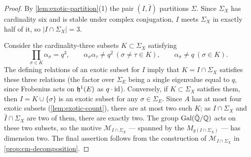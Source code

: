 \begin{proof}
  By \cref{lem:exotic-partition}(1) the pair \((I, \bar I)\) partitions
  \(\Sigma\). Since \(\Sigma_X\) has cardinality six and is stable under complex
  conjugation, \(I\) meets \(\Sigma_X\) in exactly half of it, so
  \(|I \cap \Sigma_X| = 3\).

  Consider the cardinality-three subsets \(K \subset \Sigma_X\) satisfying
  \[\prod_{\sigma \in K} \alpha_\sigma = q^3, \qquad
    \alpha_\sigma \alpha_\tau \neq q^2 \ (\sigma \neq \tau \in K), \qquad
    \alpha_\sigma \neq q \ (\sigma \in K).\]
  The defining relations of an exotic subset for \(I\) imply that
  \(K = I \cap \Sigma_X\) satisfies these three relations (the factor over
  \(\Sigma_E\) being a single eigenvalue equal to \(q\), since Frobenius acts on
  \(\mathfrak{h}^1(E)\) as \(q\cdot\mathrm{id}\)). Conversely, if \(K \subset \Sigma_X\) satisfies
  them, then \(I = K \cup \{\sigma\}\) is an exotic subset for any
  \(\sigma \in \Sigma_E\). Since \(A\) has at most four exotic subsets
  (\cref{lem:exotic-count}), there are at most two such \(K\); as
  \(I \cap \Sigma_X\) and \(\bar I \cap \Sigma_X\) are two of them, there are
  exactly two. The group \(\mathrm{Gal}(\bar{\mathbb{Q}}/\mathbb{Q})\) acts on these two subsets, so the
  motive \(\mathcal{M}_{I \cap \Sigma_X}\) — spanned by the \(M_{g(I \cap
  \Sigma_X)}\) — has dimension two. The final assertion follows from the
  construction of \(\mathcal{M}_{I \cap \Sigma_X}\) in
  \cref{prop:cm-decomposition}.
\end{proof}

